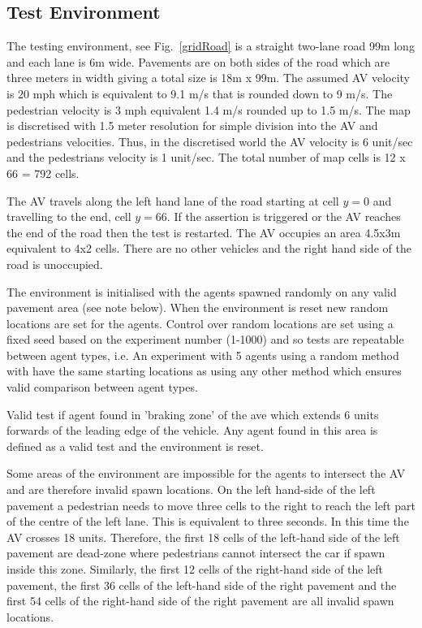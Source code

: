 \documentclass[letterpaper, 10 pt, journal, twoside]{IEEEtran}
\begin{document}
\subsection{Test Environment}
The testing environment, see Fig.~\ref{gridRoad} is a straight two-lane road 99m long and each lane is 6m wide. Pavements are on both sides of the road which are three meters in width giving a total size is 18m x 99m. 
%
The assumed AV velocity is 20 mph which is equivalent to 9.1 m/s that is rounded down to 9 m/s. The pedestrian velocity is 3 mph equivalent 1.4 m/s rounded up to 1.5 m/s. The map is discretised with 1.5 meter resolution for simple division into the AV and pedestrians velocities. Thus, in the discretised world the AV velocity is 6 unit/sec and the pedestrians velocity is 1 unit/sec. The total number of map cells is 12 x 66 = 792 cells. 

The AV travels along the left hand lane of the road starting at cell $y=0$ and travelling to the end, cell $y=66$. If the assertion is triggered or the AV reaches the end of the road then the test is restarted. The AV occupies an area 4.5x3m equivalent to 4x2 cells. There are no other vehicles and the right hand side of the road is unoccupied.

The environment is initialised with the agents spawned randomly on any valid pavement area (see note below). When the environment is reset new random locations are set for the agents. Control over random locations are set using a fixed seed based on the experiment number (1-1000) and so tests are repeatable between agent types, i.e. An experiment with 5 agents using a random method with have the same starting locations as using any other method which ensures valid comparison between agent types.

Valid test if agent found in 'braking zone' of the ave which extends 6 units forwards of the leading edge of the vehicle. Any agent found in this area is defined as a valid test and the environment is reset.

Some areas of the environment are impossible for the agents to intersect the AV and are therefore invalid spawn locations. On the left hand-side of the left pavement a pedestrian needs to move three cells to the right to reach the left part of the centre of the left lane. This is equivalent to three seconds. In this time the AV crosses 18 units. Therefore, the first 18 cells of the left-hand side of the left pavement are dead-zone where pedestrians cannot intersect the car if spawn inside this zone. Similarly, the first 12 cells of the right-hand side of the left pavement, the first 36 cells of the left-hand side of the right pavement and the first 54 cells of the right-hand side of the right pavement are all invalid spawn locations. 
\end{document}
